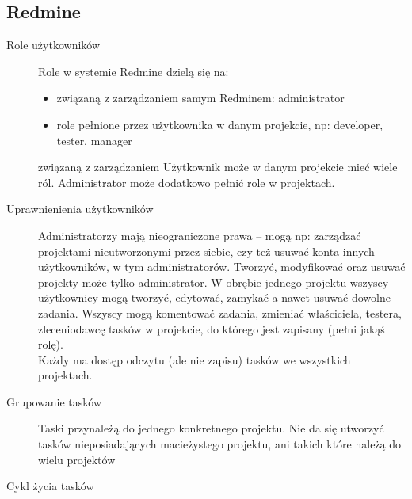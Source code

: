 \documentclass[a4paper,12pt,notitlepage]{mwrep}
\begin{document}
\subsection{Redmine}
\de
\begin{description}
	\item[Role użytkowników]
		Role w systemie Redmine dzielą się na:
		\begin{itemize}
			\item	związaną z zarządzaniem samym Redminem: administrator
			\item	role pełnione przez użytkownika w danym projekcie, np:  developer, tester, manager
		\end{itemize}	związaną z zarządzaniem 
		Użytkownik może w danym projekcie mieć wiele ról. Administrator może dodatkowo pełnić role w projektach.
	\item[Uprawnienienia użytkowników]
		Administratorzy mają nieograniczone prawa -- mogą np: zarządzać projektami nieutworzonymi przez siebie,
		czy też usuwać konta innych użytkowników, w tym administratorów.\je
		Tworzyć, modyfikować oraz usuwać projekty może tylko administrator.
		W obrębie jednego projektu wszyscy użytkownicy mogą tworzyć, edytować, zamykać a nawet usuwać
		dowolne zadania. Wszyscy mogą komentować zadania, zmieniać właściciela, testera, zleceniodawcę
		tasków w projekcie, do którego jest zapisany (pełni jakąś rolę).\\
		Każdy ma dostęp odczytu (ale nie zapisu) tasków we wszystkich projektach.\\
	\item[Grupowanie tasków]
		Taski przynależą do jednego konkretnego projektu. Nie da się utworzyć tasków nieposiadających
		macieżystego projektu, ani takich które należą do wielu projektów
	\item[Cykl życia tasków]

\end{description}
\end{document}
